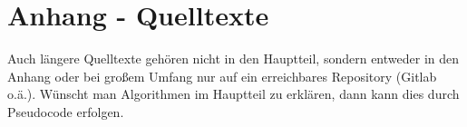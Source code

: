 
\clearpage
\chapter{Anhang - Quelltexte}
Auch längere Quelltexte gehören nicht in den Hauptteil, sondern entweder in den Anhang oder bei großem Umfang nur auf ein erreichbares Repository (Gitlab o.ä.). Wünscht man Algorithmen im Hauptteil zu erklären, dann kann dies durch Pseudocode erfolgen.

